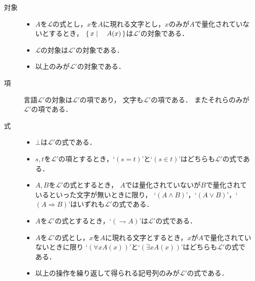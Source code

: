 	\begin{description}
		\item[対象]
			\begin{itemize}
				\item $A$を$\mathcal{L}$の式とし，$x$を$A$に現れる文字とし，$x$のみが$A$で量化されていないとするとき，
					$\left\{\, x \mid \quad A(x)\, \right\}$は$\mathcal{L}'$の対象である．
					
				\item $\mathcal{L}$の対象は$\mathcal{L}'$の対象である．
				
				\item 以上のみが$\mathcal{L}'$の対象である．
			\end{itemize}
			
		\item[項] 言語$\mathcal{L}'$の対象は$\mathcal{L}'$の項であり，
			文字も$\mathcal{L}'$の項である．
			またそれらのみが$\mathcal{L}'$の項である．
	
		\item[式] 
			\begin{itemize}
				\item $\bot$は$\mathcal{L}'$の式である．
				
				\item $s,t$を$\mathcal{L}'$の項とするとき，`$(s=t)$'と`$(s \in t)$'はどちらも$\mathcal{L}'$の式である．
					
				\item $A,B$を$\mathcal{L}'$の式とするとき，
					$A$では量化されていないが$B$で量化されているといった文字が無いときに限り，
					`$(A \wedge B)$'，`$(A \vee B)$'，`$(A \Longrightarrow B)$'はいずれも$\mathcal{L}'$の式である．
				
				\item $A$を$\mathcal{L}'$の式とするとき，`$(\rightharpoondown A)$'は$\mathcal{L}'$の式である．
				
				\item $A$を$\mathcal{L}'$の式とし，$x$を$A$に現れる文字とするとき，$x$が$A$で量化されていないときに限り
					`$(\forall x A(x))$'と`$(\exists x A(x))$'はどちらも$\mathcal{L}'$の式である．
				
				\item 以上の操作を繰り返して得られる記号列のみが$\mathcal{L}'$の式である．
			\end{itemize}
	\end{description}
	
	
